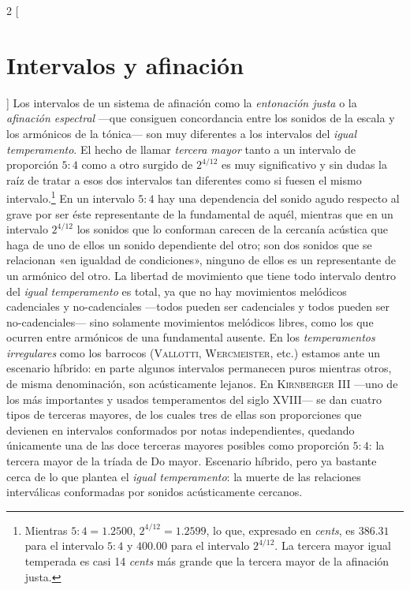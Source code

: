 \documentclass[a4paper,11pt]{article}
\begin{document}
\newpage
\begin{multicols}{2}
[\section{Intervalos y afinación}\label{sec:intervalos-afinacion}]
  Los intervalos de un sistema de afinación como la \emph{entonación justa} o la \emph{afinación espectral} ---que consiguen concordancia entre los sonidos de la escala y los armónicos de la tónica--- son muy diferentes a los intervalos del \emph{igual temperamento}. El hecho de llamar \emph{tercera mayor} tanto a un intervalo de proporción $5:4$ como a otro surgido de $2^{4/12}$ es muy significativo y sin dudas la raíz de tratar a esos dos intervalos tan diferentes como si fuesen el mismo intervalo.\footnote{Mientras $5:4=1.2500$, $2^{4/12}=1.2599$, lo que, expresado en \emph{cents}, es $386.31$ para el intervalo $5:4$ y $400.00$ para el intervalo $2^{4/12}$. La tercera mayor igual temperada es casi 14 \emph{cents} más grande que la tercera mayor de la afinación justa.} En un intervalo $5:4$ hay una dependencia del sonido agudo respecto al grave por ser éste representante de la fundamental de aquél, mientras que en un intervalo $2^{4/12}$ los sonidos que lo conforman carecen de la cercanía acústica que haga de uno de ellos un sonido dependiente del otro; son dos sonidos que se relacionan «en igualdad de condiciones», ninguno de ellos es un representante de un armónico del otro. La libertad de movimiento que tiene todo intervalo dentro del \emph{igual temperamento} es total, ya que no hay movimientos melódicos cadenciales y no-cadenciales ---todos pueden ser cadenciales y todos pueden ser no-cadenciales--- sino solamente movimientos melódicos libres, como los que ocurren entre armónicos de una fundamental ausente. En los \emph{temperamentos irregulares} como los barrocos (\textsc{Vallotti}, \textsc{Wercmeister}, etc.) estamos ante un escenario híbrido: en parte algunos intervalos permanecen puros mientras otros, de misma denominación, son acústicamente lejanos. En \textsc{Kirnberger III} ---uno de los más importantes y usados temperamentos del siglo XVIII--- se dan cuatro tipos de terceras mayores, de los cuales tres de ellas son proporciones que devienen en intervalos conformados por notas independientes, quedando únicamente una de las doce terceras mayores posibles como proporción $5:4$: la tercera mayor de la tríada de Do mayor. Escenario híbrido, pero ya bastante cerca de lo que plantea el \emph{igual temperamento}: la muerte de las relaciones interválicas conformadas por sonidos acústicamente cercanos.
\end{multicols}
\end{document}
